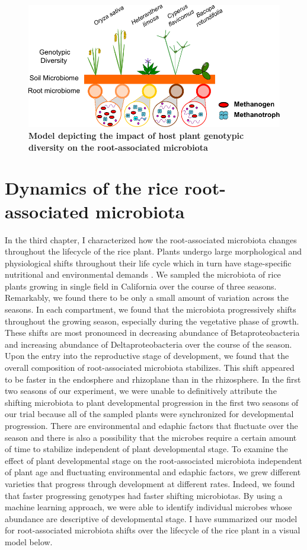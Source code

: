 \begin{figure}[h]
\centering
\includegraphics[width=6in]{Figures/figurec_2}
\caption[Figure 5.2]{\textbf{Model depicting the impact of host plant genotypic diversity on the root-associated microbiota}}
\label{Figure 5.2}
\end{figure}

\section{Dynamics of the rice root-associated microbiota}
In the third chapter, I characterized how the root-associated microbiota changes throughout the lifecycle of the rice plant. Plants undergo large morphological and physiological shifts throughout their life cycle which in turn have stage-specific nutritional and environmental demands \cite{Ishimaru2013}. We sampled the microbiota of rice plants growing in single field in California over the course of three seasons. Remarkably, we found there to be only a small amount of variation across the seasons. In each compartment, we found that the microbiota progressively shifts throughout the growing season, especially during the vegetative phase of growth. These shifts are most pronounced in decreasing abundance of Betaproteobacteria and increasing abundance of Deltaproteobacteria over the course of the season. Upon the entry into the reproductive stage of development, we found that the overall composition of root-associated microbiota stabilizes. This shift appeared to be faster in the endosphere and rhizoplane than in the rhizosphere. In the first two seasons of our experiment, we were unable to definitively attribute the shifting microbiota to plant developmental progression in the first two seasons of our trial because all of the sampled plants were synchronized for developmental progression. There are environmental and edaphic factors that fluctuate over the season and there is also a possibility that the microbes require a certain amount of time to stabilize independent of plant developmental stage. To examine the effect of plant developmental stage on the root-associated microbiota independent of plant age and fluctuating environmental and edaphic factors, we grew different varieties that progress through development at different rates. Indeed, we found that faster progressing genotypes had faster shifting microbiotas. By using a machine learning approach, we were able to identify individual microbes whose abundance are descriptive of developmental stage. I have summarized our model for root-associated microbiota shifts over the lifecycle of the rice plant in a visual model below.

